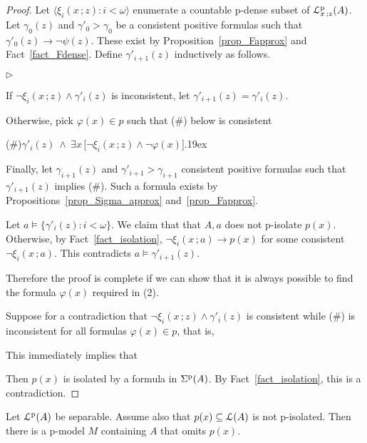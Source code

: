 \documentclass[10pt,oneside]{amsproc}
\newcommand{\mylabel}[1]{{#1}\hfill}
\renewenvironment{itemize}
  {\begin{list}{$\triangleright$}{%
  \setlength{\parskip}{0mm}
  \setlength{\topsep}{.4\baselineskip}
  \setlength{\rightmargin}{0mm}
  \setlength{\listparindent}{0mm}
  \setlength{\itemindent}{0mm}
  \setlength{\labelwidth}{3ex}
  \setlength{\itemsep}{.2\baselineskip}
  \setlength{\parsep}{.2\baselineskip}
  \setlength{\partopsep}{0mm}
  \setlength{\labelsep}{1ex}
  \setlength{\leftmargin}{\labelwidth+\labelsep}
  \let\makelabel\mylabel}}{%
\end{list}}
\begin{document}
{\begin{proof}
  Let $\langle\xi_i(x\,;z):i<\omega\rangle$ enumerate a countable p-dense subset of ${\EuScript L}^{\rm p}_{x\,;z}(A)$.
  Let $\gamma_0(z)$ and $\gamma'_0>\gamma_0$ be a consistent positive formulas such that $\gamma'_0(z)\rightarrow\neg\psi(z)$.
  These exist by Proposition~\ref{prop_Fapprox} and Fact~\ref{fact_Fdense}.
  Define $\gamma'_{i+1}(z)$ inductively as follows.
  
  \begin{itemize}
     \item[1.] If $\neg\xi_i(x\,;z)\wedge\gamma'_i(z)$ is inconsistent, let  $\gamma'_{i+1}(z)=\gamma'_i(z)$.
     \item[2.] Otherwise, pick $\varphi(x)\in p$ such that (\#) below is consistent
     
     (\#)\hfil$\gamma'_i(z)\ \wedge\ \exists x\,\big[\neg\xi_i(x\,;z)\wedge\neg\varphi(x)\big].$\kern19ex
     
     Finally, let $\gamma_{i+1}(z)$ and $\gamma'_{i+1}>\gamma_{i+1}$ consistent positive formulas such that $\gamma'_{i+1}(z)$ implies (\#).
     Such a formula exists by Propositions~\ref{prop_Sigma_approx} and~\ref{prop_Fapprox}.
  \end{itemize}
  Let $a\models\{\gamma'_i(z):i<\omega\}$.
  We claim that that $A,a$ does not p-isolate $p(x)$.
  Otherwise, by Fact~\ref{fact_isolation}, $\neg\xi_i(x\,;a)\rightarrow p(x)$ for some consistent $\neg\xi_i(x\,;a)$.
  This contradicts $a\models\gamma'_{i+1}(z)$.
  
  Therefore the proof is complete if we can show that it is always possible to find the formula $\varphi(x)$ required in (2).
  
  Suppose for a contradiction that $\neg\xi_i(x\,;z)\wedge\gamma'_i(z)$ is consistent while (\#) is inconsistent for all formulas $\varphi(x)\in p$, that is, 
  
  
  This immediately implies that 
  
  
  Then $p(x)$ is isolated by a formula in $\Sigma^{\rm p}(A)$.
  By Fact~\ref{fact_isolation}, this is a contradiction.
  \end{proof}
  

\begin{theorem}\label{prop_OTT}
  Let ${\EuScript L}^{\rm p}(A)$ be separable.
  Assume also that $p(x)\subseteq{\EuScript L}(A)$ is not p-isolated.
  Then there is a p-model $M$ containing $A$ that omits $p(x)$. 
\end{theorem}

}
\end{document}
